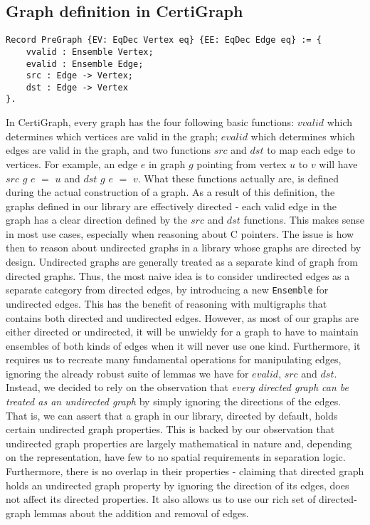 \subsection{Graph definition in CertiGraph}

\begin{lstlisting}
Record PreGraph {EV: EqDec Vertex eq} {EE: EqDec Edge eq} := {
	vvalid : Ensemble Vertex;
	evalid : Ensemble Edge;
	src : Edge -> Vertex;
	dst : Edge -> Vertex
}.
\end{lstlisting}
In CertiGraph, every graph has the four following basic functions: $vvalid$ which determines which vertices are valid in the graph; $evalid$ which determines which edges are valid in the graph, and two functions $src$ and $dst$ to map each edge to vertices. For example, an edge $e$ in graph $g$ pointing from vertex $u$ to $v$ will have $src$ $g$ $e$ $=$ $u$ and $dst$ $g$ $e$ $=$ $v$. What these functions actually are, is defined during the actual construction of a graph.
\newline\newline
As a result of this definition, the graphs defined in our library are effectively directed - each valid edge in the graph has a clear direction defined by the $src$ and $dst$ functions. This makes sense in most use cases, especially when reasoning about C pointers.
\newline\newline
The issue is how then to reason about undirected graphs in a library whose graphs are directed by design. Undirected graphs are generally treated as a separate kind of graph from directed graphs. Thus, the most naive idea is to consider undirected edges as a separate category from directed edges, by introducing a new \texttt{Ensemble} for undirected edges. This has the benefit of reasoning with multigraphs that contains both directed and undirected edges. However, as most of our graphs are either directed or undirected, it will be unwieldy for a graph to have to maintain ensembles of both kinds of edges when it will never use one kind. Furthermore, it requires us to recreate many fundamental operations for manipulating edges, ignoring the already robust suite of lemmas we have for $evalid$, $src$ and $dst$.
\newline\newline
Instead, we decided to rely on the observation that \textit{every directed graph can be treated as an undirected graph} by simply ignoring the directions of the edges. That is, we can assert that a graph in our library, directed by default, holds certain undirected graph properties. This is backed by our observation that undirected graph properties are largely mathematical in nature and, depending on the representation, have few to no spatial requirements in separation logic. Furthermore, there is no overlap in their properties - claiming that directed graph holds an undirected graph property by ignoring the direction of its edges, does not affect its directed properties. It also allows us to use our rich set of directed-graph lemmas about the addition and removal of edges.

